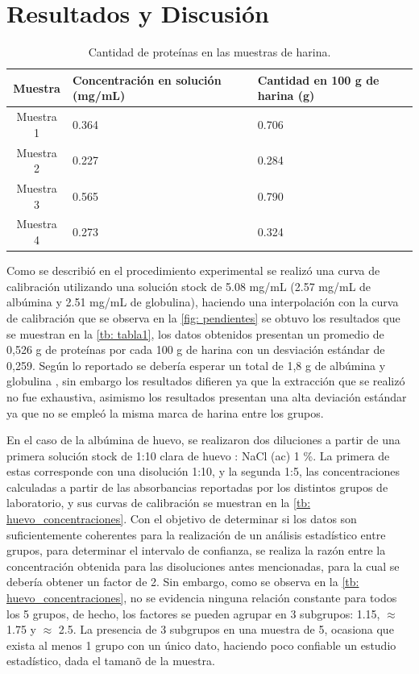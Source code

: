 \documentclass[fleqn,10pt]{SelfArx}
\begin{document}
\section{Resultados y Discusi\'on}
	\begin{table}[h]
		\centering
		\caption{Cantidad de proteínas en las muestras de harina.}
		\label{tb: tabla1}
		\begin{tabular}{c|p{3cm}p{2.5cm}}
			\hline
			\textbf{Muestra} & \textbf{Concentración en solución (mg/mL)} & \textbf{Cantidad en 100 g de harina (g)}
			\\
			\hline
			Muestra 1 & 0.364 & 0.706 \\
			Muestra 2 & 0.227 & 0.284 \\
			Muestra 3 & 0.565 & 0.790 \\
			Muestra 4 & 0.273 & 0.324 \\
			\hline
		\end{tabular}
	\end{table}
	Como se describió en el procedimiento experimental se realizó una curva de calibración utilizando una solución stock de 5.08 mg/mL (2.57 mg/mL de albúmina y 2.51 mg/mL de globulina), haciendo una interpolación con la curva de calibración que se observa en la \autoref{fig: pendientes} se obtuvo los resultados que se muestran en la \autoref{tb: tabla1}, los datos obtenidos presentan un promedio de 0,526 g de proteínas por cada 100 g de harina con un desviación estándar de 0,259. Según lo reportado se debería esperar un total de 1,8 g de albúmina y globulina \cite{payne1979subunit}, sin embargo los resultados difieren ya que la extracción que se realizó no fue exhaustiva, asimismo los resultados presentan una alta deviación estándar ya que no se empleó la misma marca de harina entre los grupos.
%	

	En el caso de la alb\'umina de huevo, se realizaron dos diluciones a partir de una primera soluci\'on stock de 1:10 clara de huevo : NaCl (ac) 1 \%. La primera de estas corresponde con una disoluci\'on 1:10, y la segunda 1:5, las concentraciones calculadas a partir de las absorbancias reportadas por los distintos grupos de laboratorio, y sus curvas de calibraci\'on se muestran en la \autoref{tb: huevo_concentraciones}. Con el objetivo de determinar si los datos son suficientemente coherentes para la realizaci\'on de un an\'alisis estad\'istico entre grupos, para determinar el intervalo de confianza, se realiza la raz\'on entre la concentraci\'on obtenida para las disoluciones antes mencionadas, para la cual se deber\'ia obtener un factor de 2. Sin embargo, como se observa en la \autoref{tb: huevo_concentraciones}, no se evidencia ninguna relaci\'on constante para todos los 5 grupos, de hecho, los factores se pueden agrupar en 3 subgrupos: 1.15, $\approx$ 1.75 y $\approx$ 2.5. La presencia de 3 subgrupos en una muestra de 5, ocasiona que exista al menos 1 grupo con un \'unico dato, haciendo poco confiable un estudio estad\'istico, dada el taman\~o de la muestra.
\end{document}
